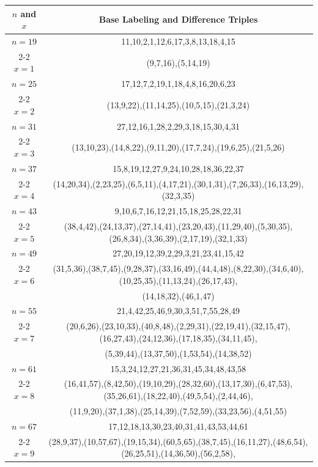 \begin{tabular}{| c | c |}
\hline
\(n\) and \(x\) & Base Labeling and Difference Triples\\
\hline
\(n=19\) & 
11,10,2,1,12,6,17,3,8,13,18,4,15\\
\cline{2-2}
\(x=1\)
&(9,7,16),(5,14,19)\\
\hline 
\(n=25\) & 
17,12,7,2,19,1,18,4,8,16,20,6,23\\
\cline{2-2}
\(x=2\)
&(13,9,22),(11,14,25),(10,5,15),(21,3,24)\\
\hline 
\(n=31\) & 
27,12,16,1,28,2,29,3,18,15,30,4,31\\
\cline{2-2}
\(x=3\)
&(13,10,23),(14,8,22),(9,11,20),(17,7,24),(19,6,25),(21,5,26)\\
\hline 
\(n=37\) & 
15,8,19,12,27,9,24,10,28,18,36,22,37\\
\cline{2-2}
\(x=4\)
&(14,20,34),(2,23,25),(6,5,11),(4,17,21),(30,1,31),(7,26,33),(16,13,29),(32,3,35)\\
\hline 
\(n=43\) & 
9,10,6,7,16,12,21,15,18,25,28,22,31\\
\cline{2-2}
\(x=5\)
&(38,4,42),(24,13,37),(27,14,41),(23,20,43),(11,29,40),(5,30,35),(26,8,34),(3,36,39),(2,17,19),(32,1,33)\\
\hline 
\(n=49\) & 
27,20,19,12,39,2,29,3,21,23,41,15,42\\
\cline{2-2}
\(x=6\)
&(31,5,36),(38,7,45),(9,28,37),(33,16,49),(44,4,48),(8,22,30),(34,6,40),(10,25,35),(11,13,24),(26,17,43),\\
&(14,18,32),(46,1,47)\\
\hline 
\(n=55\) & 
21,4,42,25,46,9,30,3,51,7,55,28,49\\
\cline{2-2}
\(x=7\)
&(20,6,26),(23,10,33),(40,8,48),(2,29,31),(22,19,41),(32,15,47),(16,27,43),(24,12,36),(17,18,35),(34,11,45),\\
&(5,39,44),(13,37,50),(1,53,54),(14,38,52)\\
\hline 
\(n=61\) & 
15,3,24,12,27,21,36,31,45,34,48,43,58\\
\cline{2-2}
\(x=8\)
&(16,41,57),(8,42,50),(19,10,29),(28,32,60),(13,17,30),(6,47,53),(35,26,61),(18,22,40),(49,5,54),(2,44,46),\\
&(11,9,20),(37,1,38),(25,14,39),(7,52,59),(33,23,56),(4,51,55)\\
\hline 
\(n=67\) & 
17,12,18,13,30,23,40,31,41,43,53,44,61\\
\cline{2-2}
\(x=9\)
&(28,9,37),(10,57,67),(19,15,34),(60,5,65),(38,7,45),(16,11,27),(48,6,54),(26,25,51),(14,36,50),(56,2,58),\\

\end{tabular}
